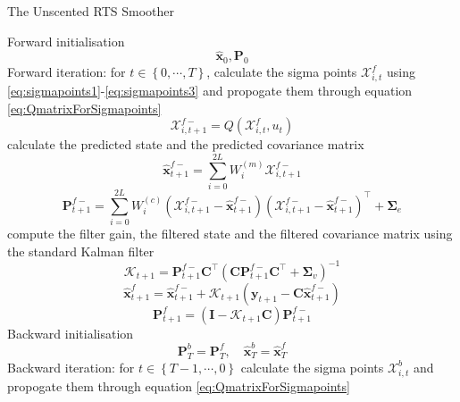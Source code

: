 \documentclass[12pt]{iopart}
\begin{document}
\begin{algorithm}
	\begin{small}
	\caption{The Unscented RTS Smoother}\label{UKFAlgorithm} 
	\begin{algorithmic}[1] 
		\State Forward initialisation 
		\begin{equation*}
		 \hat{\mathbf x}_0, \mathbf P_0 
		\end{equation*}
		\State Forward iteration: for $t \in \left\lbrace 0,\cdots, T\right\rbrace $,
		calculate the sigma points $\mathcal X_{i,t}^f$ using \ref{eq:sigmapoints1}-\ref{eq:sigmapoints3} and propogate them through equation \ref{eq:QmatrixForSigmapoints}
		\begin{equation*}
			\mathcal X_{i,t+1}^{f-}=Q(\mathcal X_{i,t}^f,u_t) 
		\end{equation*}
		calculate the predicted state and the predicted covariance matrix
		\begin{equation*}
			\hat{\mathbf x}_{t+1}^{f-}=\sum_{i=0}^{2L} W_i^{(m)}\mathcal X_{i,t+1}^{f-} 
		\end{equation*}
		\begin{equation*}
			\mathbf P_{t +1}^{f-}=\sum_{i=0}^{2L} W_i^{(c)}(\mathcal X_{i,t+1}^{f-}-\hat{\mathbf x}_{t +1}^{f-})(\mathcal X_{i,t+1}^{f-}-\hat{\mathbf x}_{t +1}^{f-})^\top+\boldsymbol \Sigma_e 
		\end{equation*}
		compute the filter gain, the filtered state and the filtered covariance matrix using the standard Kalman filter 
		\begin{equation*}
			\mathcal K_{t+1}=\mathbf P_{t +1}^{f-}\mathbf C ^\top(\mathbf C \mathbf P_{t +1}^{f-}\mathbf C ^\top+\boldsymbol \Sigma_v)^{-1} 
		\end{equation*}
		\begin{equation*}
			\hat{\mathbf x}_{t+1}^{f}=\hat{\mathbf x}_{t+1}^{f-}+\mathcal K_{t+1}(\mathbf y_{t+1}-\mathbf C\hat{\mathbf x}_{t +1}^{f-}) 
		\end{equation*}
		\begin{equation*}
			\mathbf P_{t+1}^f=(\mathbf I - \mathcal K_{t+1}\mathbf C)\mathbf P_{t +1}^{f-} 
		\end{equation*}
		\State Backward initialisation 
		\begin{equation*}
			\mathbf P_T^b= \mathbf P_T^f, \quad \hat{\mathbf x}^b_T= \hat{\mathbf x}^f_T 
		\end{equation*}
		\State Backward iteration: for $t \in \left\lbrace T-1, \cdots, 0 \right\rbrace $ calculate the sigma points $\mathcal X_{i,t}^b$ and propogate them through equation \ref{eq:QmatrixForSigmapoints}

\end{algorithmic}
\end{small}
\end{algorithm}
\end{document}
